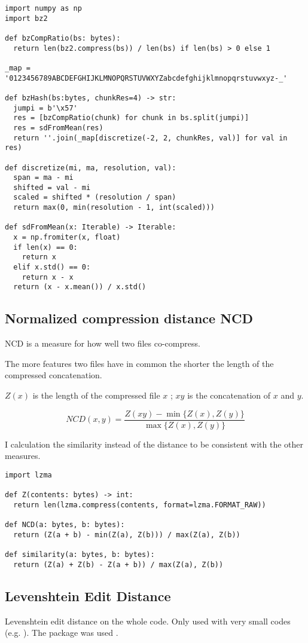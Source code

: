 \documentclass[../main.tex]{subfiles}
\begin{document}
\begin{lstlisting}[style=pymd]
import numpy as np
import bz2

def bzCompRatio(bs: bytes):
  return len(bz2.compress(bs)) / len(bs) if len(bs) > 0 else 1

_map = '0123456789ABCDEFGHIJKLMNOPQRSTUVWXYZabcdefghijklmnopqrstuvwxyz-_'

def bzHash(bs:bytes, chunkRes=4) -> str:
  jumpi = b'\x57'
  res = [bzCompRatio(chunk) for chunk in bs.split(jumpi)]
  res = sdFromMean(res)
  return ''.join(_map[discretize(-2, 2, chunkRes, val)] for val in res)

def discretize(mi, ma, resolution, val):
  span = ma - mi
  shifted = val - mi
  scaled = shifted * (resolution / span)
  return max(0, min(resolution - 1, int(scaled)))

def sdFromMean(x: Iterable) -> Iterable:
  x = np.fromiter(x, float)
  if len(x) == 0:
    return x
  elif x.std() == 0:
    return x - x
  return (x - x.mean()) / x.std()
\end{lstlisting}

\subsection{Normalized compression distance NCD}

NCD is a measure for how well two files co-compress.

The more features two files have in common the shorter the length of the compressed concatenation.

$Z(x)$ is the length of the compressed file $x$ ; $xy$ is the concatenation of $x$ and $y$.

\begin{equation}
  NCD(x,y) = \dfrac{Z(xy) - \min \{Z(x),Z(y)\}}{\max \{Z(x),Z(y)\}}
\end{equation}

I calculation the similarity instead of the distance to be consistent with the other measures.

\begin{lstlisting}[style=pymd]
import lzma

def Z(contents: bytes) -> int:
  return len(lzma.compress(contents, format=lzma.FORMAT_RAW))

def NCD(a: bytes, b: bytes):
  return (Z(a + b) - min(Z(a), Z(b))) / max(Z(a), Z(b))

def similarity(a: bytes, b: bytes):
  return (Z(a) + Z(b) - Z(a + b)) / max(Z(a), Z(b))
\end{lstlisting}

\subsection{Levenshtein Edit Distance}
Levenshtein edit distance on the whole code. Only used with very small codes (e.g. ).
The  package  was used \cite{pyLev}.
\end{document}
